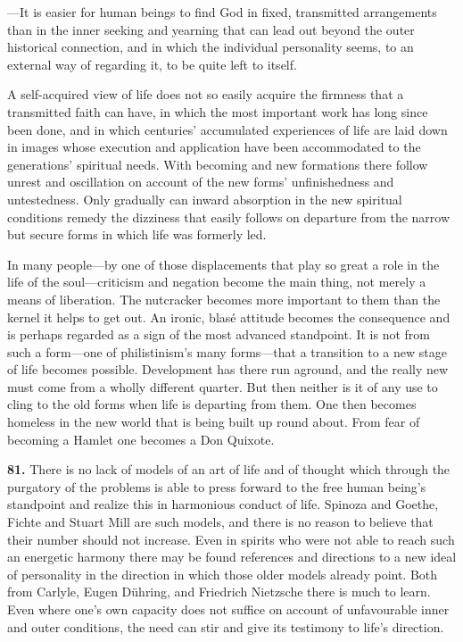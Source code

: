 \documentclass[12pt,a4paper]{book}
\newcommand{\opage}[1]{\marginnote{\footnotesize\textit{[#1]}}}
\begin{document}
---It is easier for human beings to find God in fixed, transmitted arrangements than in the inner seeking and
yearning that can lead out beyond the outer historical connection, and in which the individual personality
seems, to an external way of regarding it, to be quite left to itself.

A self-acquired view of life does not so easily acquire the firmness that a transmitted faith can have, in
which the most important work has long since been done, and in which centuries' accumulated experiences of
life are laid down in images whose execution and application have been accommodated to the generations'
spiritual needs. With becoming and new formations there follow unrest and oscillation on account of the new
forms' unfinishedness and untestedness. Only gradually can inward absorption in the new spiritual conditions
remedy the dizziness that easily follows on departure from the narrow but secure forms in which life was
formerly led.

In many people---by one of those displacements that play so great a 
\opage{188}role in the life of the soul---criticism
and negation become the main thing, not merely a means of liberation. The nutcracker becomes more important to
them than the kernel it helps to get out. An ironic, blasé attitude becomes the consequence and is perhaps
regarded as a sign of the most advanced standpoint. It is not from such a form---one of philistinism's many
forms---that a transition to a new stage of life becomes possible. Development has there run aground, and the
really new must come from a wholly different quarter. But then neither is it of any use to cling to the old
forms when life is departing from them. One then becomes homeless in the new world that is being built up round
about. From fear of becoming a Hamlet one becomes a Don Quixote.

\medskip

\noindent\textbf{81.} There is no lack of models of an art of life and of thought which through the purgatory
of the problems is able to press forward to the free human being's standpoint and realize this in harmonious
conduct of life. Spinoza and Goethe, Fichte and Stuart Mill are such models, and there is no reason to believe
that their number should not increase. Even in spirits who were not able to reach such an energetic harmony
there may be found references and directions to a new ideal of personality in the direction in which those
older models already point. Both from Carlyle, Eugen Dühring, and Friedrich Nietzsche there is much to learn.
Even where one's own capacity does not suffice on account of unfavourable inner and outer conditions, the need
can stir and give its testimony to life's direction.
\end{document}
